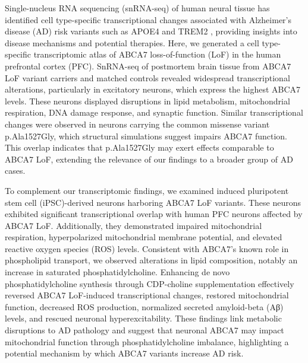 Single-nucleus RNA sequencing (snRNA-seq) of human neural tissue has identified cell type-specific transcriptional changes associated with Alzheimer's disease (AD) risk variants such as APOE4 and TREM2 \cite{Brase2023-xk,Blanchard2022-cf,Sayed2021-qn,Wamsley2024-zm,Kamath2022-if}, providing insights into disease mechanisms and potential therapies. Here, we generated a cell type-specific transcriptomic atlas of ABCA7 loss-of-function (LoF) in the human prefrontal cortex (PFC). SnRNA-seq of postmortem brain tissue from ABCA7 LoF variant carriers and matched controls revealed widespread transcriptional alterations, particularly in excitatory neurons, which express the highest ABCA7 levels. These neurons displayed disruptions in lipid metabolism, mitochondrial respiration, DNA damage response, and synaptic function. Similar transcriptional changes were observed in neurons carrying the common missense variant p.Ala1527Gly, which structural simulations suggest impairs ABCA7 function. This overlap indicates that p.Ala1527Gly may exert effects comparable to ABCA7 LoF, extending the relevance of our findings to a broader group of AD cases.

To complement our transcriptomic findings, we examined induced pluripotent stem cell (iPSC)-derived neurons harboring ABCA7 LoF variants. These neurons exhibited significant transcriptional overlap with human PFC neurons affected by ABCA7 LoF. Additionally, they demonstrated impaired mitochondrial respiration, hyperpolarized mitochondrial membrane potential, and elevated reactive oxygen species (ROS) levels. Consistent with ABCA7's known role in phospholipid transport, we observed alterations in lipid composition, notably an increase in saturated phosphatidylcholine. Enhancing de novo phosphatidylcholine synthesis through CDP-choline supplementation effectively reversed ABCA7 LoF-induced transcriptional changes, restored mitochondrial function, decreased ROS production, normalized secreted amyloid-beta (Aβ) levels, and rescued neuronal hyperexcitability. These findings link metabolic disruptions to AD pathology and suggest that neuronal ABCA7 may impact mitochondrial function through phosphatidylcholine imbalance, highlighting a potential mechanism by which ABCA7 variants increase AD risk.

